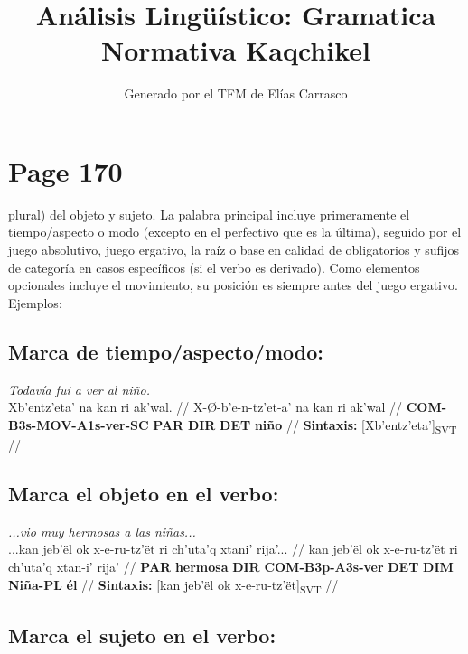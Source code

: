 \documentclass{article}%
\title{Análisis Lingüístico: Gramatica Normativa Kaqchikel}%
\author{Generado por el TFM de Elías Carrasco}%
\begin{document}
%
\normalsize%
\maketitle%
\section{Page 170}%
\label{sec:Page170}%
plural) del objeto y sujeto. La palabra principal incluye primeramente el tiempo/aspecto %
o modo (excepto en el perfectivo que es la última), seguido por el juego absolutivo, %
juego ergativo, la raíz o base en calidad de obligatorios y sufijos de categoría en casos %
específicos (si el verbo es derivado). Como elementos opcionales incluye el movimiento, %
su posición es siempre antes del juego ergativo. Ejemplos: %
\subsection{Marca de tiempo/aspecto/modo:}%
\label{subsec:Marcadetiempo/aspecto/modo}%

%
\par\medskip%
\ex
\textit{Todavía fui a ver al niño.} \\
\begingl
\gla Xb'entz'eta' na kan ri ak'wal. //
\glb X-Ø-b'e-n-tz'et-a' na kan ri ak'wal //
\glc \textbf{COM-}\textbf{B3s-}\textbf{MOV-}\textbf{A1s-}\textbf{ver-}\textbf{SC} \textbf{PAR} \textbf{DIR} \textbf{DET} \textbf{niño} //
\glft \textbf{Sintaxis:} [Xb'entz'eta']\textsubscript{SVT} //
\endgl
\xe
%
\medskip%
\subsection{Marca el objeto en el verbo:}%
\label{subsec:Marcaelobjetoenelverbo}%

%
\par\medskip%
\ex
\textit{...vio muy hermosas a las niñas...} \\
\begingl
\gla ...kan jeb'ël ok x-e-ru-tz'ët ri ch'uta'q xtani' rija'... //
\glb kan jeb'ël ok x-e-ru-tz'ët ri ch'uta'q xtan-i' rija' //
\glc \textbf{PAR} \textbf{hermosa} \textbf{DIR} \textbf{COM-}\textbf{B3p-}\textbf{A3s-}\textbf{ver} \textbf{DET} \textbf{DIM} \textbf{Niña-PL} \textbf{él} //
\glft \textbf{Sintaxis:} [kan jeb'ël ok x-e-ru-tz'ët]\textsubscript{SVT} //
\endgl
\xe
%
\medskip%
\subsection{Marca el sujeto en el verbo:}%
\label{subsec:Marcaelsujetoenelverbo}%
\end{document}
